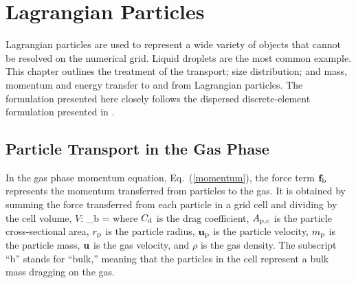 

\chapter{Lagrangian Particles}
\label{chapter:lagrangian_particles}

Lagrangian particles are used to represent a wide variety of objects that cannot be resolved on
the numerical grid. Liquid droplets are the most common example. This chapter outlines the treatment of the transport; size
distribution; and mass, momentum and energy transfer to and from Lagrangian particles.  The formulation presented here closely follows the dispersed discrete-element formulation presented in \cite{Crowe:1}.

\section{Particle Transport in the Gas Phase}

In the gas phase momentum equation, Eq.~(\ref{momentum}), the force term ${\mathbf{f}}_{\rm b}$ represents the momentum transferred from particles to the gas. It is obtained by summing the force transferred from each particle in a grid cell and dividing by the cell volume, $V$:
\be
    {\bof_{\rm b}} =  \sum  {} \label{part_force}
\ee
where $C_{\rm d}$ is the drag coefficient, $A_{\rm p,c}$ is the particle cross-sectional area, $r_{\rm p}$ is the particle radius, ${\mathbf{u}}_{\rm p}$ is the particle velocity, $m_{\rm p}$ is the particle mass, ${\mathbf{u}}$ is the gas velocity, and $\rho$ is the gas density. The subscript ``b'' stands for ``bulk,'' meaning that the particles in the cell represent a bulk mass dragging on the gas.

